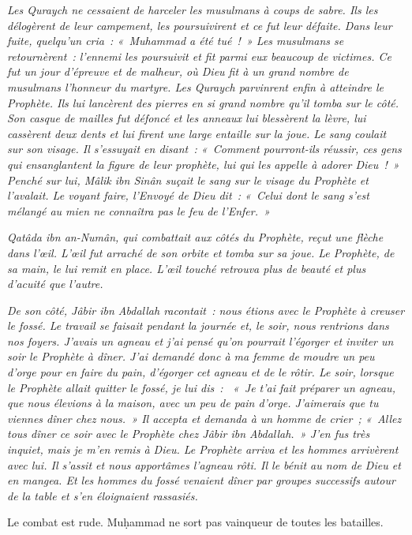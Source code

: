 \emph{Les Quraych ne cessaient de harceler les musulmans à coups de
sabre. Ils les délogèrent de leur campement, les poursuivirent et ce fut
leur défaite. Dans leur fuite, quelqu'un cria~: «~Muhammad a été tué~!~»
Les musulmans se retournèrent~: l'ennemi les poursuivit et fit parmi eux
beaucoup de victimes. Ce fut un jour d'épreuve et de malheur, où Dieu
fit à un grand nombre de musulmans l'honneur du martyre. Les Quraych
parvinrent enfin à atteindre le Prophète. Ils lui lancèrent des pierres
en si grand nombre qu'il tomba sur le côté. Son casque de mailles fut
défoncé et les anneaux lui blessèrent la lèvre, lui cassèrent deux dents
et lui firent une large entaille sur la joue. Le sang coulait sur son
visage. Il s'essuyait en disant~: «~Comment pourront-ils réussir, ces
gens qui ensanglantent la figure de leur prophète, lui qui les appelle à
adorer Dieu~!~» Penché sur lui, Mâlik ibn Sinân suçait le sang sur le
visage du Prophète et l'avalait. Le voyant faire, l'Envoyé de Dieu dit~:
«~Celui dont le sang s'est mélangé au mien ne connaîtra pas le feu de
l'Enfer.~»}

\emph{Qatâda ibn an-Numân, qui combattait aux côtés du Prophète,
reçut une flèche dans l'œil. L'œil fut arraché de son orbite et tomba
sur sa joue. Le Prophète, de sa main, le lui remit en place. L'œil
touché retrouva plus de beauté et plus d'acuité que l'autre.}

\emph{De son côté, Jâbir ibn Abdallah racontait~: nous étions avec le
Prophète à creuser le fossé. Le travail se faisait pendant la journée
et, le soir, nous rentrions dans nos foyers. J'avais un agneau et j'ai
pensé qu'on pourrait l'égorger et inviter un soir le Prophète à dîner.
J'ai demandé donc à ma femme de moudre un peu d'orge pour en faire du
pain, d'égorger cet agneau et de le rôtir. Le soir, lorsque le Prophète
allait quitter le fossé, je lui dis~:~ «~Je t'ai fait préparer un
agneau, que nous élevions à la maison, avec un peu de pain d'orge.
J'aimerais que tu viennes dîner chez nous.~» Il accepta et demanda à un
homme de crier~; «~Allez tous dîner ce soir avec le Prophète chez Jâbir
ibn Abdallah.~» J'en fus très inquiet, mais je m'en remis à Dieu. Le
Prophète arriva et les hommes arrivèrent avec lui. Il s'assit et nous
apportâmes l'agneau rôti. Il le bénit au nom de Dieu et en mangea. Et
les hommes du fossé venaient dîner par groupes successifs autour de la
table et s'en éloignaient rassasiés.}

Le combat est rude. Muḥammad ne sort pas vainqueur de toutes les
batailles.

